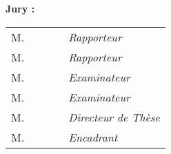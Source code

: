 {\begin{titlepage}
\begin{center}
 		\end{center}
 		\noindent \large \textbf{Jury :}
 		\begin{center}
 			\begin{tabular}{llccl}
 				M.		& \revOneName 	& \revOneTitle	&	\revOneAff	& \textit{Rapporteur}\\
 				M.		& \revTwoName	& \revTwoTitle	&	\revTwoAff	& \textit{Rapporteur}\\	
 				M.		& \examOneName	& \examOneTitle	&	\examOneAff	& \textit{Examinateur}\\
 				M.		& \examTwoName	& \examTwoTitle 	&	\examTwoAff	& \textit{Examinateur}\\
 				M.		& \dirName 		& \dirTitle		&	\dirAff		& \textit{Directeur de Th\`ese}\\
 				M. 	& \supName 		& \supTitle		&	\supAff		& \textit{Encadrant}\\
 			\end{tabular}
 		\end{center}
 		\restoregeometry
 	\end{titlepage}
 }
 
 

